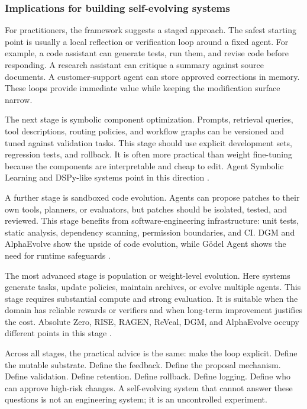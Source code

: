 \subsubsection{Implications for building self-evolving systems}

For practitioners, the framework suggests a staged approach. The safest starting point is usually a local reflection or verification loop around a fixed agent. For example, a code assistant can generate tests, run them, and revise code before responding. A research assistant can critique a summary against source documents. A customer-support agent can store approved corrections in memory. These loops provide immediate value while keeping the modification surface narrow.

The next stage is symbolic component optimization. Prompts, retrieval queries, tool descriptions, routing policies, and workflow graphs can be versioned and tuned against validation tasks. This stage should use explicit development sets, regression tests, and rollback. It is often more practical than weight fine-tuning because the components are interpretable and cheap to edit. Agent Symbolic Learning and DSPy-like systems point in this direction \cite{agentsymboliclearning2024}.

A further stage is sandboxed code evolution. Agents can propose patches to their own tools, planners, or evaluators, but patches should be isolated, tested, and reviewed. This stage benefits from software-engineering infrastructure: unit tests, static analysis, dependency scanning, permission boundaries, and CI. DGM and AlphaEvolve show the upside of code evolution, while G{\"o}del Agent shows the need for runtime safeguards \cite{darwingodelmachine2025,alphaevolve2025,yin2024godel}.

The most advanced stage is population or weight-level evolution. Here systems generate tasks, update policies, maintain archives, or evolve multiple agents. This stage requires substantial compute and strong evaluation. It is suitable when the domain has reliable rewards or verifiers and when long-term improvement justifies the cost. Absolute Zero, RISE, RAGEN, ReVeal, DGM, and AlphaEvolve occupy different points in this stage \cite{absolutezero2025,qu2024rise,wang2025ragen,reveal2025,darwingodelmachine2025,alphaevolve2025}.

Across all stages, the practical advice is the same: make the loop explicit. Define the mutable substrate. Define the feedback. Define the proposal mechanism. Define validation. Define retention. Define rollback. Define logging. Define who can approve high-risk changes. A self-evolving system that cannot answer these questions is not an engineering system; it is an uncontrolled experiment.

